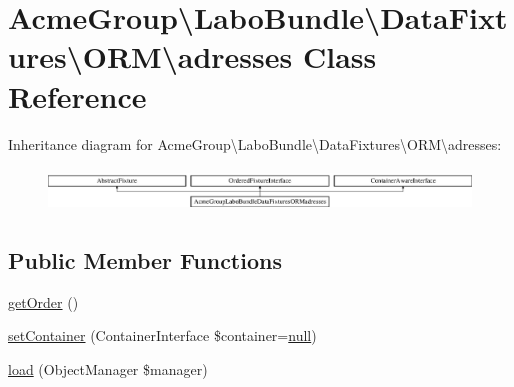 \hypertarget{class_acme_group_1_1_labo_bundle_1_1_data_fixtures_1_1_o_r_m_1_1adresses}{\section{Acme\+Group\textbackslash{}Labo\+Bundle\textbackslash{}Data\+Fixtures\textbackslash{}O\+R\+M\textbackslash{}adresses Class Reference}
\label{class_acme_group_1_1_labo_bundle_1_1_data_fixtures_1_1_o_r_m_1_1adresses}
}
Inheritance diagram for Acme\+Group\textbackslash{}Labo\+Bundle\textbackslash{}Data\+Fixtures\textbackslash{}O\+R\+M\textbackslash{}adresses\+:\begin{figure}[H]
\begin{center}
\leavevmode
\includegraphics[height=1.163032cm]{class_acme_group_1_1_labo_bundle_1_1_data_fixtures_1_1_o_r_m_1_1adresses}
\end{center}
\end{figure}
\subsection*{Public Member Functions}
\begin{DoxyCompactItemize}
\item 
\hyperlink{class_acme_group_1_1_labo_bundle_1_1_data_fixtures_1_1_o_r_m_1_1adresses_aaede354de6a457e6d59fe39597a3d1d9}{get\+Order} ()
\item 
\hyperlink{class_acme_group_1_1_labo_bundle_1_1_data_fixtures_1_1_o_r_m_1_1adresses_a43f5557dce401d53f0b658b5f22ca224}{set\+Container} (Container\+Interface \$container=\hyperlink{validate_8js_afb8e110345c45e74478894341ab6b28e}{null})
\item 
\hyperlink{class_acme_group_1_1_labo_bundle_1_1_data_fixtures_1_1_o_r_m_1_1adresses_ae450181536d91b0b98e23bd1b08518da}{load} (Object\+Manager \$manager)
\end{DoxyCompactItemize}


